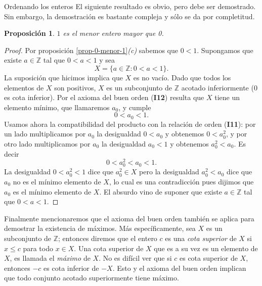 \documentclass[11pt,spanish,makeidx]{amsbook}
\newtheorem{proposicion}[teorema]{Proposici\'on}
\theoremstyle{definition}
\theoremstyle{remark}
\newcommand \ZZ{{\mathbb Z}}
\begin{document}
\begin{section}{Ordenando los enteros}
El siguiente resultado es obvio, pero  debe ser demostrado. Sin embargo,  la demostración es bastante compleja y sólo se da por completitud. 
\begin{proposicion}
$1$ es el menor entero mayor que 0.
\end{proposicion}
\begin{proof}
Por proposición \ref{prop-0-menor-1}{\it (c)} sabemos que $0 < 1$. Supongamos que existe $a \in \mathbb Z$ tal que $0<a<1$ y sea 
$$
X=\{a\in\mathbb Z: 0<a<1\}.
$$
La  suposición que hicimos implica que $X$ es no vacío.  Dado que todos los elementos de $X$ son positivos, $X$ es un subconjunto de $\mathbb Z$ acotado inferiormente (0 es cota inferior). Por el axioma del buen orden (\textbf{I12}) resulta que $X$ tiene un elemento mínimo, que llamaremos $a_0$, y cumple
$$
0<a_0<1. 
$$
Usamos ahora la compatibilidad del  producto con  la relación de orden (\textbf{I11}):  por un lado multiplicamos por $a_0$ la desigualdad $0<a_0$ y obtenemos $0<a_0^2$,  y por otro lado multiplicamos por $a_0$ la desigualdad $a_0<1$ y obtenemos $a_0^2<a_0$. Es decir
$$
 0<a_0^2<a_0<1.
$$
La desigualdad $0<a_0^2<1$ dice que $a_0^2\in X$ pero la desigualdad $a_0^2<a_0$ dice que  $a_0$ no es el mínimo elemento de $X$, lo cual es una contradicción pues dijimos que $a_0$ es el mínimo elemento de $X$.  El  absurdo  vino de suponer que existe $a \in \mathbb Z$ tal que   $0<a<1$.
\end{proof}

Finalmente mencionaremos que el axioma del buen orden también se aplica para demostrar la existencia de máximos. Más específicamente, sea $X$ es un subconjunto de $\mathbb Z$; entonces diremos que el entero $c$ es una {\em cota superior} de $X$ si $x\le c$  para todo $x \in X$. Una cota superior de  $X$ que es a su vez es un elemento de $X$, es llamada el {\em máximo} de $X$. 
No es difícil ver que si $c$ es cota superior de  $X$,  entonces $-c$ es cota inferior de $-X$. Esto  y el axioma del buen orden implican que todo conjunto acotado superiormente tiene máximo.  

\begin{comment}
\begin{proposicion}
Sea $X$ subconjunto no vacío y finito de $\ZZ$,  entonces $X$  tiene máximo y mínimo. 
\end{proposicion}
\begin{proof}
Al ser un conjunto finito está acotado inferiormente y superiormente, 
 por  lo tanto tiene mínimo y máximo.  
\end{proof}	
\end{comment}



\end{section}
\end{document}
